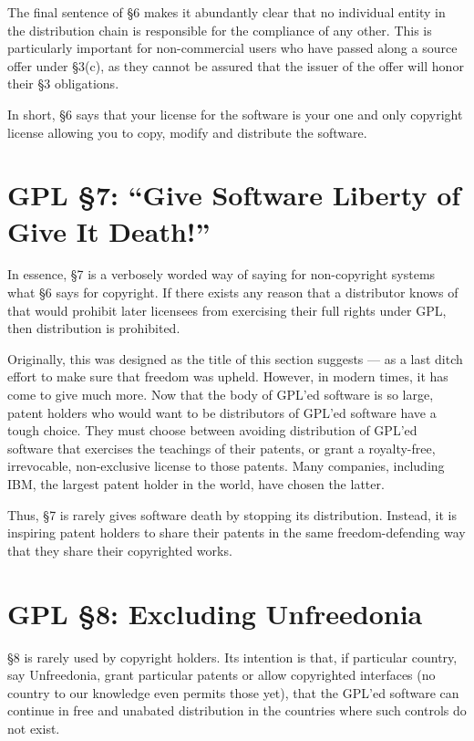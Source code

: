 \documentclass[12pt]{report}
\begin{document}
The final sentence of \S 6 makes it abundantly clear that no individual
entity in the distribution chain is responsible for the compliance of any
other.  This is particularly important for non-commercial users who have
passed along a source offer under \S 3(c), as they cannot be assured that
the issuer of the offer will honor their \S 3 obligations.

In short, \S 6 says that your license for the software is your one and
only copyright license allowing you to copy, modify and distribute the
software.

\section{GPL \S 7: ``Give Software Liberty of Give It Death!''}
\label{GPLs7}

In essence, \S 7 is a verbosely worded way of saying for non-copyright
systems what \S 6 says for copyright.  If there exists any reason that a
distributor knows of that would prohibit later licensees from exercising
their full rights under GPL, then distribution is prohibited.

Originally, this was designed as the title of this section suggests --- as
a last ditch effort to make sure that freedom was upheld.  However, in
modern times, it has come to give much more.  Now that the body of GPL'ed
software is so large, patent holders who would want to be distributors of
GPL'ed software have a tough choice.  They must choose between avoiding
distribution of GPL'ed software that exercises the teachings of their
patents, or grant a royalty-free, irrevocable, non-exclusive license to
those patents.  Many companies, including IBM, the largest patent holder
in the world, have chosen the latter.

Thus, \S 7 is rarely gives software death by stopping its distribution.
Instead, it is inspiring patent holders to share their patents in the same
freedom-defending way that they share their copyrighted works.

\section{GPL \S 8: Excluding Unfreedonia}
\label{GPLs8}

\S 8 is rarely used by copyright holders.  Its intention is that, if
particular country, say Unfreedonia, grant particular patents or allow
copyrighted interfaces (no country to our knowledge even permits those
yet), that the GPL'ed software can continue in free and unabated
distribution in the countries where such controls do not exist.
\end{document}
